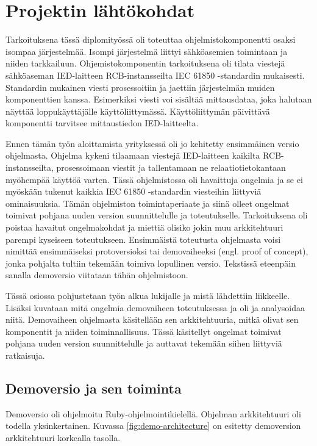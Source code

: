 \chapter{Projektin lähtökohdat}
\label{ch:projektin-lähtökohdat}
Tarkoituksena tässä diplomityössä oli toteuttaa ohjelmistokomponentti osaksi isompaa järjestelmää. Isompi järjestelmä liittyi sähköasemien toimintaan ja niiden tarkkailuun. Ohjemistokomponentin tarkoituksena oli tilata viestejä sähköaseman IED-laitteen RCB-instansseilta IEC 61850 -standardin mukaisesti. Standardin mukainen viesti prosessoitiin ja jaettiin järjestelmän muiden komponenttien kanssa. Esimerkiksi viesti voi sisältää mittausdataa, joka halutaan näyttää loppukäyttäjälle käyttöliittymässä. Käyttöliittymän päivittävä komponentti tarvitsee mittaustiedon IED-laitteelta.

Ennen tämän työn aloittamista yrityksessä oli jo kehitetty ensimmäinen versio ohjelmasta. Ohjelma kykeni tilaamaan viestejä IED-laitteen kaikilta RCB-instansseilta, prosessoimaan viestit ja tallentamaan ne relaatiotietokantaan myöhempää käyttöä varten. Tässä ohjelmistossa oli havaittuja ongelmia ja se ei myöskään tukenut kaikkia IEC 61850 -standardin viesteihin liittyviä ominaisuuksia. Tämän ohjelmiston toimintaperiaate ja siinä olleet ongelmat toimivat pohjana uuden version suunnittelulle ja toteutukselle. Tarkoituksena oli poistaa havaitut ongelmakohdat ja miettiä olisiko jokin muu arkkitehtuuri parempi kyseiseen toteutukseen. Ensimmäistä toteutusta ohjelmasta voisi nimittää ensimmäiseksi protoversioksi tai demovaiheeksi (engl. proof of concept), jonka pohjalta tultiin tekemään toimiva lopullinen versio. Tekstissä eteenpäin sanalla demoversio viitataan tähän ohjelmistoon.

Tässä osiossa pohjustetaan työn alkua lukijalle ja mistä lähdettiin liikkeelle. Lisäksi kuvataan mitä ongelmia demovaiheen toteutuksessa ja oli ja analysoidaa niitä. Demovaiheen ohjelmasta käsitellään sen arkkitehtuuria, mitkä olivat sen komponentit ja niiden toiminnallisuus. Tässä käsitellyt ongelmat toimivat pohjana uuden version suunnittelulle ja auttavat tekemään siihen liittyviä ratkaisuja.


\section{Demoversio ja sen toiminta}
\label{ch:demoversio-ja-sen-toiminta}
Demoversio oli ohjelmoitu Ruby-ohjelmointikielellä. Ohjelman arkkitehtuuri oli todella yksinkertainen. Kuvassa \ref{fig:demo-architecture} on esitetty demoversion arkkitehtuuri korkealla tasolla.


